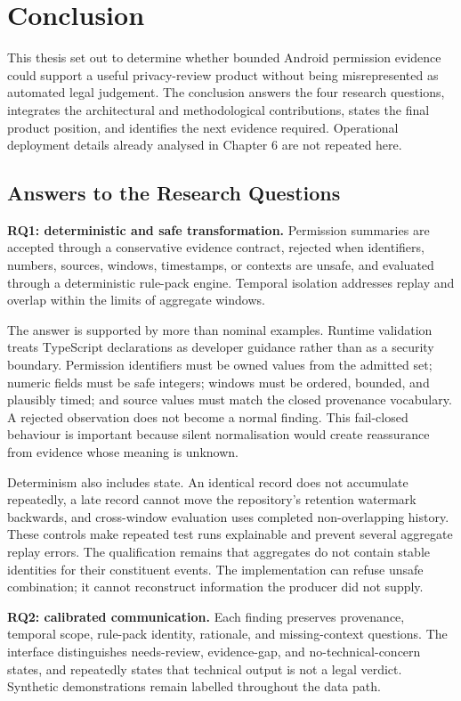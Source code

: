 \section{Conclusion}

This thesis set out to determine whether bounded Android permission evidence could support a useful privacy-review product without being misrepresented as automated legal judgement. The conclusion answers the four research questions, integrates the architectural and methodological contributions, states the final product position, and identifies the next evidence required. Operational deployment details already analysed in Chapter 6 are not repeated here.

\subsection{Answers to the Research Questions}

\textbf{RQ1: deterministic and safe transformation.} Permission summaries are accepted through a conservative evidence contract, rejected when identifiers, numbers, sources, windows, timestamps, or contexts are unsafe, and evaluated through a deterministic rule-pack engine. Temporal isolation addresses replay and overlap within the limits of aggregate windows.

The answer is supported by more than nominal examples. Runtime validation treats TypeScript declarations as developer guidance rather than as a security boundary. Permission identifiers must be owned values from the admitted set; numeric fields must be safe integers; windows must be ordered, bounded, and plausibly timed; and source values must match the closed provenance vocabulary. A rejected observation does not become a normal finding. This fail-closed behaviour is important because silent normalisation would create reassurance from evidence whose meaning is unknown.

Determinism also includes state. An identical record does not accumulate repeatedly, a late record cannot move the repository's retention watermark backwards, and cross-window evaluation uses completed non-overlapping history. These controls make repeated test runs explainable and prevent several aggregate replay errors. The qualification remains that aggregates do not contain stable identities for their constituent events. The implementation can refuse unsafe combination; it cannot reconstruct information the producer did not supply.

\textbf{RQ2: calibrated communication.} Each finding preserves provenance, temporal scope, rule-pack identity, rationale, and missing-context questions. The interface distinguishes needs-review, evidence-gap, and no-technical-concern states, and repeatedly states that technical output is not a legal verdict. Synthetic demonstrations remain labelled throughout the data path.

